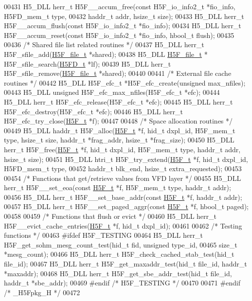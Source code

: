 \begin{DoxyCode}
00431 H5\_DLL herr\_t H5F\_\_accum\_free(\textcolor{keyword}{const} H5F\_io\_info2\_t *fio\_info, H5FD\_mem\_t type,
00432     haddr\_t addr, hsize\_t size);
00433 H5\_DLL herr\_t H5F\_\_accum\_flush(\textcolor{keyword}{const} H5F\_io\_info2\_t *fio\_info);
00434 H5\_DLL herr\_t H5F\_\_accum\_reset(\textcolor{keyword}{const} H5F\_io\_info2\_t *fio\_info, hbool\_t flush);
00435 
00436 \textcolor{comment}{/* Shared file list related routines */}
00437 H5\_DLL herr\_t H5F\_sfile\_add(\hyperlink{struct_h5_f__file__t}{H5F\_file\_t} *shared);
00438 H5\_DLL \hyperlink{struct_h5_f__file__t}{H5F\_file\_t} * H5F\_sfile\_search(\hyperlink{struct_h5_f_d__t}{H5FD\_t} *lf);
00439 H5\_DLL herr\_t H5F\_sfile\_remove(\hyperlink{struct_h5_f__file__t}{H5F\_file\_t} *shared);
00440 
00441 \textcolor{comment}{/* External file cache routines */}
00442 H5\_DLL H5F\_efc\_t *H5F\_efc\_create(\textcolor{keywordtype}{unsigned} max\_nfiles);
00443 H5\_DLL \textcolor{keywordtype}{unsigned} H5F\_efc\_max\_nfiles(H5F\_efc\_t *efc);
00444 H5\_DLL herr\_t H5F\_efc\_release(H5F\_efc\_t *efc);
00445 H5\_DLL herr\_t H5F\_efc\_destroy(H5F\_efc\_t *efc);
00446 H5\_DLL herr\_t H5F\_efc\_try\_close(\hyperlink{struct_h5_f__t}{H5F\_t} *f);
00447 
00448 \textcolor{comment}{/* Space allocation routines */}
00449 H5\_DLL haddr\_t H5F\_alloc(\hyperlink{struct_h5_f__t}{H5F\_t} *f, hid\_t dxpl\_id, H5F\_mem\_t type, hsize\_t size, haddr\_t *frag\_addr, 
      hsize\_t *frag\_size);
00450 H5\_DLL herr\_t H5F\_free(\hyperlink{struct_h5_f__t}{H5F\_t} *f, hid\_t dxpl\_id, H5F\_mem\_t type, haddr\_t addr, hsize\_t size);
00451 H5\_DLL htri\_t H5F\_try\_extend(\hyperlink{struct_h5_f__t}{H5F\_t} *f, hid\_t dxpl\_id, H5FD\_mem\_t type, 
00452     haddr\_t blk\_end, hsize\_t extra\_requested);
00453 
00454 \textcolor{comment}{/* Functions that get/retrieve values from VFD layer */}
00455 H5\_DLL herr\_t H5F\_\_set\_eoa(\textcolor{keyword}{const} \hyperlink{struct_h5_f__t}{H5F\_t} *f, H5F\_mem\_t type, haddr\_t addr);
00456 H5\_DLL herr\_t H5F\_\_set\_base\_addr(\textcolor{keyword}{const} \hyperlink{struct_h5_f__t}{H5F\_t} *f, haddr\_t addr);
00457 H5\_DLL herr\_t H5F\_\_set\_paged\_aggr(\textcolor{keyword}{const} \hyperlink{struct_h5_f__t}{H5F\_t} *f, hbool\_t paged);
00458 
00459 \textcolor{comment}{/* Functions that flush or evict */}
00460 H5\_DLL herr\_t H5F\_\_evict\_cache\_entries(\hyperlink{struct_h5_f__t}{H5F\_t} *f, hid\_t dxpl\_id);
00461 
00462 \textcolor{comment}{/* Testing functions */}
00463 \textcolor{preprocessor}{#ifdef H5F\_TESTING}
00464 H5\_DLL herr\_t H5F\_get\_sohm\_mesg\_count\_test(hid\_t fid, \textcolor{keywordtype}{unsigned} type\_id,
00465     \textcolor{keywordtype}{size\_t} *mesg\_count);
00466 H5\_DLL herr\_t H5F\_check\_cached\_stab\_test(hid\_t file\_id);
00467 H5\_DLL herr\_t H5F\_get\_maxaddr\_test(hid\_t file\_id, haddr\_t *maxaddr);
00468 H5\_DLL herr\_t H5F\_get\_sbe\_addr\_test(hid\_t file\_id, haddr\_t *sbe\_addr);
00469 \textcolor{preprocessor}{#endif }\textcolor{comment}{/* H5F\_TESTING */}\textcolor{preprocessor}{}
00470 
00471 \textcolor{preprocessor}{#endif }\textcolor{comment}{/* \_H5Fpkg\_H */}\textcolor{preprocessor}{}
00472 
\end{DoxyCode}

